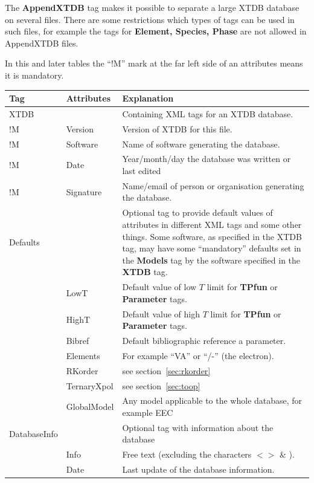 \documentclass{article}
\begin{document}
The {\bf AppendXTDB} tag makes it possible to separate a large XTDB
database on several files.  There are some restrictions which types of
tags can be used in such files, for example the tags for {\bf Element,
  Species, Phase} are not allowed in AppendXTDB files.

In this and later tables the ``!M'' mark at the far left side of an
attributes means it is mandatory.

\begin{tabular}{|p{} p{} p{}|}\hline
  Tag & Attributes & Explanation\\\hline

XTDB    &         & Containing XML tags for an XTDB database.\\
!M      & Version & Version of XTDB for this file.\\
!M      &Software & Name of software generating the database.\\
!M      &Date     & Year/month/day the database was written or last edited\\
!M      &Signature & Name/email of person or organisation generating the database.\\\hline
  
Defaults & & Optional tag to provide default values of attributes in
             different XML tags and some other things.  Some software, as
             specified in the XTDB tag,  may have some ``mandatory'' defaults
             set in the {\bf Models} tag by the software specified in the
             {\bf XTDB} tag.\\
         & LowT & Default value of low $T$ limit for {\bf TPfun} or 
                 {\bf Parameter} tags.\\
         & HighT & Default value of high $T$ limit for {\bf TPfun} or 
                 {\bf Parameter} tags.\\
         & Bibref & Default bibliographic reference a parameter. \\
         & Elements & For example ``VA'' or ``/-'' (the electron).\\
         & RKorder & see section~\ref{sec:rkorder} \\
         & TernaryXpol & see section~\ref{sec:toop} \\
         & GlobalModel & Any model applicable to the whole database,
                 for example EEC~\cite{21Sun}\\\hline

DatabaseInfo & & Optional tag with information about the database\\
         & Info & Free text (excluding the characters $< >$ \& ).\\
         & Date & Last update of the database information.\\\hline


\end{tabular}
\end{document}
